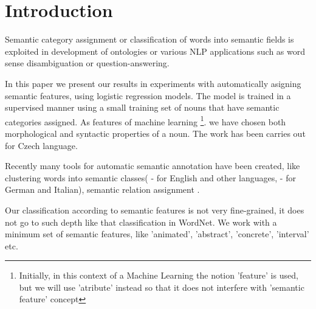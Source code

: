 \documentclass[letterpaper]{article}
\begin{document}
%
\title{}
\maketitle
\begin{abstract}
\begin{quote}
\end{quote}
\end{abstract}


\section{Introduction}
Semantic category assignment or classification of words into semantic fields 
is exploited in development of ontologies or various NLP applications such as 
word sense disambiguation or question-answering.

In this paper we present our results in experiments with automatically asigning semantic features,
using logistic regression models. The model is trained in a supervised manner
using a small training set of nouns that have semantic categories assigned. 
As features of machine learning \footnote{Initially, in this context of a Machine Learning the notion 'feature'
is used, but we will use 'atribute' instead so that it does not interfere with 'semantic feature' concept}.
we have chosen both morphological and syntactic properties of a noun.
The work has been carries out for Czech language.

Recently many tools for automatic semantic annotation have been created, like
clustering words into semantic classes(\cite{wordnet} - for English and other languages,
\cite{baroni:2009} - for German and Italian), semantic relation assignment \cite{peirsman}.

Our classification according to semantic features is not very fine-grained,
it does not go to such depth like that classification
in WordNet. We work with a minimum set of semantic features, like 'animated',
'abstract', 'concrete', 'interval' etc. 
\end{document}
